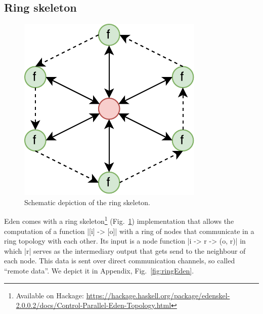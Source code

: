 \subsection{Ring skeleton} \label{sec:ring}
\begin{figure}[h]
	\includegraphics[scale=0.75]{images/ring}
	\caption{Schematic depiction of the ring skeleton.}
	\label{fig:ringImg}
\end{figure}
Eden comes with a ring skeleton\footnote{Available on Hackage: \url{https://hackage.haskell.org/package/edenskel-2.0.0.2/docs/Control-Parallel-Eden-Topology.html}} (Fig.~\ref{fig:ringImg}) implementation that allows the computation of a function |[i] -> [o]| with a ring of nodes that communicate in a ring topology with each other. Its input is a node function |i -> r -> (o, r)| in which |r| serves as the intermediary output that gets send to the neighbour of each node. This data is sent over direct communication channels, so called \enquote{remote data}. We depict it in Appendix, Fig.~\ref{fig:ringEden}.


